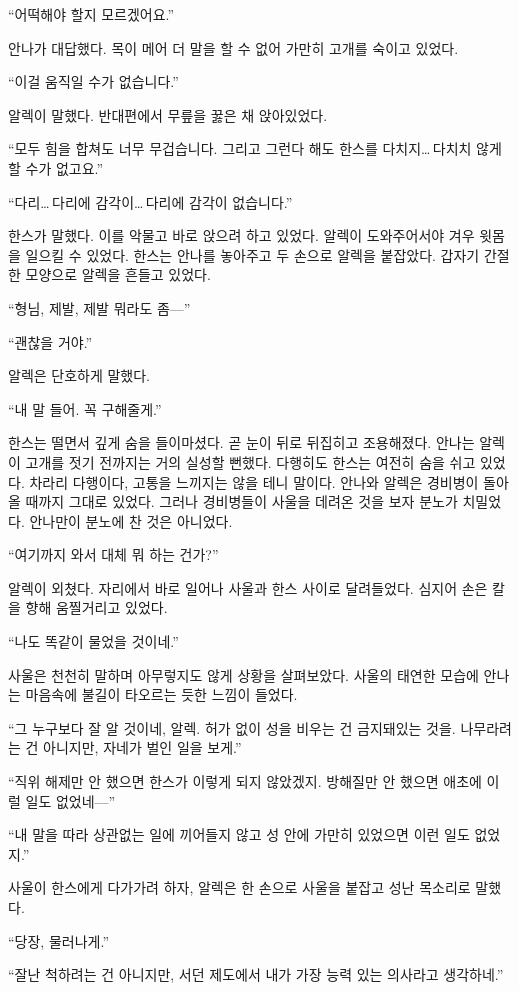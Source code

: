 ``어떡해야 할지 모르겠어요.''

안나가 대답했다. 목이 메어 더 말을 할 수 없어 가만히 고개를 숙이고 있었다.

``이걸 움직일 수가 없습니다.''

알렉이 말했다. 반대편에서 무릎을 꿇은 채 앉아있었다.

``모두 힘을 합쳐도 너무 무겁습니다. 그리고 그런다 해도 한스를 다치지\ldots\,다치치 않게 할 수가 없고요.''

``다리\ldots\,다리에 감각이\ldots\,다리에 감각이 없습니다.''

한스가 말했다. 이를 악물고 바로 앉으려 하고 있었다. 알렉이 도와주어서야 겨우 윗몸을 일으킬 수 있었다. 한스는 안나를 놓아주고 두 손으로 알렉을 붙잡았다. 갑자기 간절한 모양으로 알렉을 흔들고 있었다.

``형님, 제발, 제발 뭐라도 좀—''

``괜찮을 거야.''

알렉은 단호하게 말했다.

``내 말 들어. 꼭 구해줄게.''

한스는 떨면서 깊게 숨을 들이마셨다. 곧 눈이 뒤로 뒤집히고 조용해졌다. 안나는 알렉이 고개를 젓기 전까지는 거의 실성할 뻔했다. 다행히도 한스는 여전히 숨을 쉬고 있었다. 차라리 다행이다, 고통을 느끼지는 않을 테니 말이다. 안나와 알렉은 경비병이 돌아올 때까지 그대로 있었다. 그러나 경비병들이 사울을 데려온 것을 보자 분노가 치밀었다. 안나만이 분노에 찬 것은 아니었다.

``여기까지 와서 대체 뭐 하는 건가?''

알렉이 외쳤다. 자리에서 바로 일어나 사울과 한스 사이로 달려들었다. 심지어 손은 칼을 향해 움찔거리고 있었다.

``나도 똑같이 물었을 것이네.''

사울은 천천히 말하며 아무렇지도 않게 상황을 살펴보았다. 사울의 태연한 모습에 안나는 마음속에 불길이 타오르는 듯한 느낌이 들었다.

``그 누구보다 잘 알 것이네, 알렉. 허가 없이 성을 비우는 건 금지돼있는 것을. 나무라려는 건 아니지만, 자네가 벌인 일을 보게.''

``직위 해제만 안 했으면 한스가 이렇게 되지 않았겠지. 방해질만 안 했으면 애초에 이럴 일도 없었네—''

``내 말을 따라 상관없는 일에 끼어들지 않고 성 안에 가만히 있었으면 이런 일도 없었지.''

사울이 한스에게 다가가려 하자, 알렉은 한 손으로 사울을 붙잡고 성난 목소리로 말했다.

``당장, 물러나게.''

``잘난 척하려는 건 아니지만, 서던 제도에서 내가 가장 능력 있는 의사라고 생각하네.''

